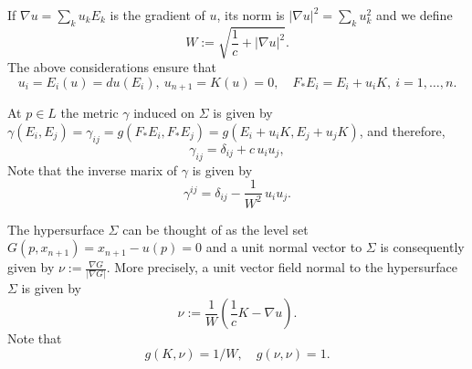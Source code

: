 \documentclass[12pt]{article}
\numberwithin{lemma}{section}
\begin{document}
If $\nabla u=\sum_k u_kE_k$ is the gradient of $u$, its norm is $|\nabla u|^2=\sum_ku_k^2$ and we define 
\begin{equation}\label{W} 
W:=\sqrt{\frac{1}{c}+|\nabla u|^2}.
\end{equation}
The above considerations ensure that 
\[ u_i=E_i(u) = du (E_i), \ u_{n+1}=K(u)=0, 
\quad 
F_* E_i = E_i+u_iK, \ i=1,\ldots,n.\]



 At $p \in L$ the metric $\gamma$ induced on $\Sigma$ is given by $\gamma(E_i,E_j)= \gamma_{ij} = g\left(F_*E_i,F_*E_j\right)=g\left(E_i+u_iK,E_j+u_jK\right)$, 
and therefore, 
\[\gamma_{ij}=\delta_{ij}+c\,u_iu_j,\]
Note that the inverse marix of $\gamma$ is given by 
\[\gamma^{ij}=\delta_{ij}-\frac{1}{W^2}\,u_iu_j. \]


The hypersurface $\Sigma$ can be thought of as the level set $G(p,x_{n+1})=x_{n+1}-u(p)=0$ and a unit normal vector to $\Sigma$ is consequently given by $\nu:=\frac{\nabla G}{|\nabla G|}$. More precisely, a unit vector field normal to the hypersurface $\Sigma$ is given by 
\[\nu:=\frac{1}{W}\left(\frac{1}{c}K-\nabla u\right).\]
Note that 
\[ g(K,\nu)=1/W, \quad g(\nu,\nu)=1.\]
\end{document}
